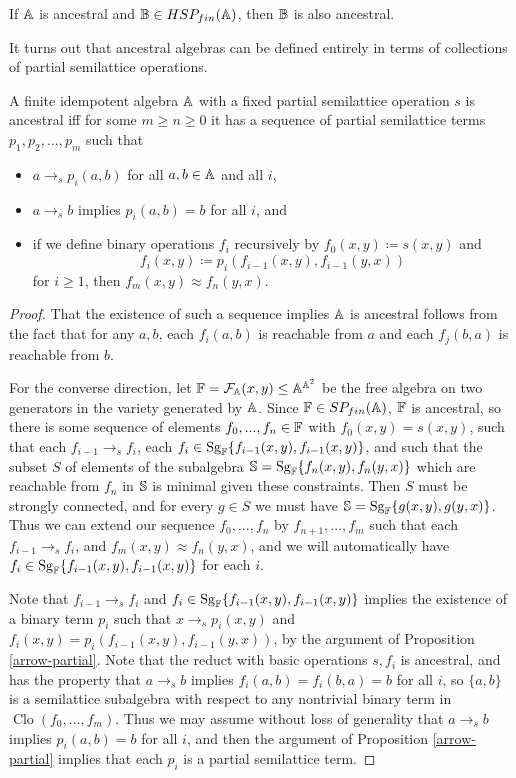 \documentclass[letterpaper,11pt]{article}
\DeclareMathOperator{\Clo}{Clo}
\DeclareMathOperator{\Sg}{Sg}
\begin{document}
\begin{cor} If $\mathbb{A}$ is ancestral and $\mathbb{B} \in HSP_{fin}(\mathbb{A})$, then $\mathbb{B}$ is also ancestral.
\end{cor}

It turns out that ancestral algebras can be defined entirely in terms of collections of partial semilattice operations.

\begin{thm}\label{ancestral-terms} A finite idempotent algebra $\mathbb{A}$ with a fixed partial semilattice operation $s$ is ancestral iff for some $m \ge n \ge 0$ it has a sequence of partial semilattice terms $p_1, p_2, ..., p_m$ such that
\begin{itemize}
\item $a \rightarrow_s p_i(a,b)$ for all $a,b \in \mathbb{A}$ and all $i$,
\item $a \rightarrow_s b$ implies $p_i(a,b) = b$ for all $i$, and
\item if we define binary operations $f_i$ recursively by $f_0(x,y) \coloneqq s(x,y)$ and
\[
f_i(x,y) \coloneqq p_i(f_{i-1}(x,y),f_{i-1}(y,x))
\]
for $i \ge 1$, then $f_m(x,y) \approx f_n(y,x)$.
\end{itemize}
\end{thm}
\begin{proof} That the existence of such a sequence implies $\mathbb{A}$ is ancestral follows from the fact that for any $a,b$, each $f_i(a,b)$ is reachable from $a$ and each $f_j(b,a)$ is reachable from $b$.

For the converse direction, let $\mathbb{F} = \mathcal{F}_{\mathbb{A}}(x,y) \le \mathbb{A}^{\mathbb{A}^2}$ be the free algebra on two generators in the variety generated by $\mathbb{A}$. Since $\mathbb{F} \in SP_{fin}(\mathbb{A})$, $\mathbb{F}$ is ancestral, so there is some sequence of elements $f_0, ..., f_n \in \mathbb{F}$ with $f_0(x,y) = s(x,y)$, such that each $f_{i-1} \rightarrow_s f_i$, each $f_i \in \Sg_{\bF}\{f_{i-1}(x,y),f_{i-1}(x,y)\}$, and such that the subset $S$ of elements of the subalgebra $\bS = \Sg_{\bF}\{f_n(x,y),f_n(y,x)\}$ which are reachable from $f_n$ in $\mathbb{S}$ is minimal given these constraints. Then $S$ must be strongly connected, and for every $g \in S$ we must have $\bS = \Sg_{\bF}\{g(x,y), g(y,x)\}$. Thus we can extend our sequence $f_0, ..., f_n$ by $f_{n+1}, ..., f_m$ such that each $f_{i-1} \rightarrow_s f_i$, and $f_m(x,y) \approx f_n(y,x)$, and we will automatically have $f_i \in \Sg_{\bF}\{f_{i-1}(x,y),f_{i-1}(x,y)\}$ for each $i$.

Note that $f_{i-1} \rightarrow_s f_i$ and $f_i \in \Sg_{\bF}\{f_{i-1}(x,y),f_{i-1}(x,y)\}$ implies the existence of a binary term $p_i$ such that $x \rightarrow_s p_i(x,y)$ and $f_i(x,y) = p_i(f_{i-1}(x,y), f_{i-1}(y,x))$, by the argument of Proposition \ref{arrow-partial}. Note that the reduct with basic operations $s, f_i$ is ancestral, and has the property that $a \rightarrow_s b$ implies $f_i(a,b) = f_i(b,a) = b$ for all $i$, so $\{a,b\}$ is a semilattice subalgebra with respect to any nontrivial binary term in $\Clo(f_0, ..., f_m)$. Thus we may assume without loss of generality that $a \rightarrow_s b$ implies $p_i(a,b) = b$ for all $i$, and then the argument of Proposition \ref{arrow-partial} implies that each $p_i$ is a partial semilattice term.
\end{proof}
\end{document}
